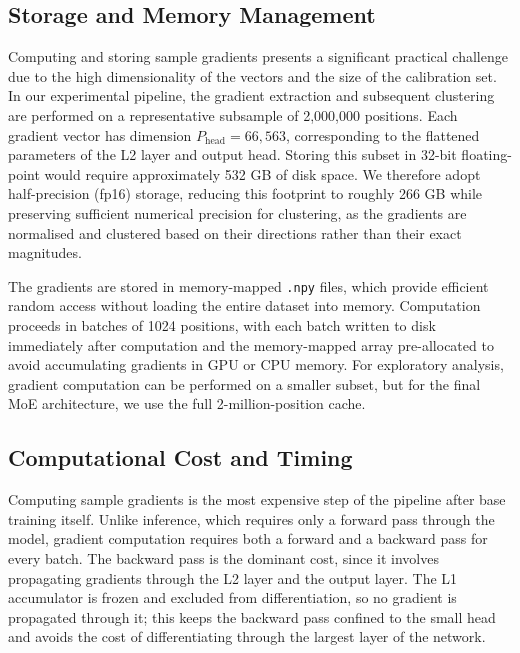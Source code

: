 \subsection{Storage and Memory Management}
Computing and storing sample gradients presents a significant practical challenge due to the high dimensionality of the vectors and the size of the calibration set. In our experimental pipeline, the gradient extraction and subsequent clustering are performed on a representative subsample of 2,000,000 positions. Each gradient vector has dimension $P_{\text{head}} = 66,563$, corresponding to the flattened parameters of the L2 layer and output head. Storing this subset in 32-bit floating-point would require approximately 532 GB of disk space. We therefore adopt half-precision (fp16) storage, reducing this footprint to roughly 266 GB while preserving sufficient numerical precision for clustering, as the gradients are normalised and clustered based on their directions rather than their exact magnitudes.

The gradients are stored in memory-mapped \texttt{.npy} files, which provide efficient random access without loading the entire dataset into memory. Computation proceeds in batches of 1024 positions, with each batch written to disk immediately after computation and the memory-mapped array pre-allocated to avoid accumulating gradients in GPU or CPU memory. For exploratory analysis, gradient computation can be performed on a smaller subset, but for the final MoE architecture, we use the full 2-million-position cache.

\subsection{Computational Cost and Timing}

Computing sample gradients is the most expensive step of the pipeline after base training itself. Unlike inference, which requires only a forward pass through the model, gradient computation requires both a forward and a backward pass for every batch. The backward pass is the dominant cost, since it involves propagating gradients through the L2 layer and the output layer. The L1 accumulator is frozen and excluded from differentiation, so no gradient is propagated through it; this keeps the backward pass confined to the small head and avoids the cost of differentiating through the largest layer of the network.

